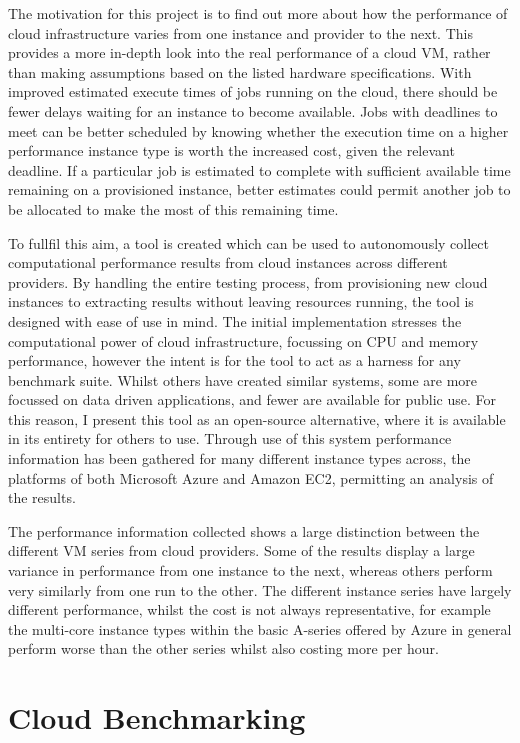 \documentclass[conference]{IEEEtran}
\begin{document}
The motivation for this project is to find out more about how the performance of cloud infrastructure varies from one instance and provider to the next. This provides a more in-depth look into the real performance of a cloud VM, rather than making assumptions based on the listed hardware specifications. With improved estimated execute times of jobs running on the cloud, there should be fewer delays waiting for an instance to become available. Jobs with deadlines to meet can be better scheduled by knowing whether the execution time on a higher performance instance type is worth the increased cost, given the relevant deadline. If a particular job is estimated to complete with sufficient available time remaining on a provisioned instance, better estimates could permit another job to be allocated to make the most of this remaining time.

To fullfil this aim, a tool is created which can be used to autonomously collect computational performance results from cloud instances across different providers. By handling the entire testing process, from provisioning new cloud instances to extracting results without leaving resources running, the tool is designed with ease of use in mind. The initial implementation stresses the computational power of cloud infrastructure, focussing on CPU and memory performance, however the intent is for the tool to act as a harness for any benchmark suite. Whilst others have created similar systems, some are more focussed on data driven applications, and fewer are available for public use. For this reason, I present this tool as an open-source alternative, where it is available in its entirety for others to use. Through use of this system performance information has been gathered for many different instance types across, the platforms of both Microsoft Azure and Amazon EC2, permitting an analysis of the results.

The performance information collected shows a large distinction between the different VM series from cloud providers. Some of the results display a large variance in performance from one instance to the next, whereas others perform very similarly from one run to the other. The different instance series have largely different performance, whilst the cost is not always representative, for example the multi-core instance types within the basic A-series offered by Azure in general perform worse than the other series whilst also costing more per hour.


\section{Cloud Benchmarking}\label{sec:bench}
\end{document}
